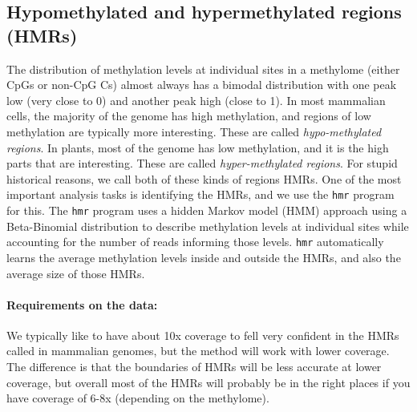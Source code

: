 \documentclass[10pt]{article}
\newcommand{\prog}[1]{\texttt{#1}}
\begin{document}
\subsection{Hypomethylated and hypermethylated regions (HMRs)}
\label{sec:indent-hypo-methyl}

The distribution of methylation levels at individual sites in a
methylome (either CpGs or non-CpG Cs) almost always has a bimodal
distribution with one peak low (very close to 0) and another peak high
(close to 1). In most mammalian cells, the majority of the genome has
high methylation, and regions of low methylation are typically more
interesting. These are called {\em hypo-methylated regions}. In
plants, most of the genome has low methylation, and it is the high
parts that are interesting. These are called {\em hyper-methylated
  regions}. For stupid historical reasons, we call both of these kinds
of regions HMRs. One of the most important analysis tasks is
identifying the HMRs, and we use the \prog{hmr} program for this. The
\prog{hmr} program uses a hidden Markov model (HMM) approach using a
Beta-Binomial distribution to describe methylation levels at
individual sites while accounting for the number of reads informing
those levels. \prog{hmr} automatically learns the average methylation
levels inside and outside the HMRs, and also the average size of those
HMRs.

\paragraph{Requirements on the data:}
We typically like to have about 10x coverage to fell very confident in
the HMRs called in mammalian genomes, but the method will work with
lower coverage. The difference is that the boundaries of HMRs will be
less accurate at lower coverage, but overall most of the HMRs will
probably be in the right places if you have coverage of 6-8x
(depending on the methylome).
\end{document}
